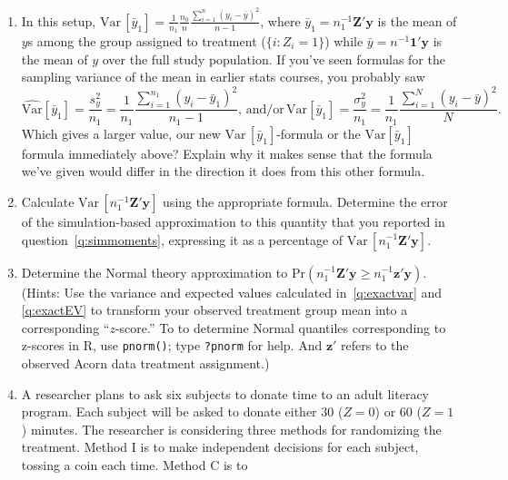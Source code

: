 \documentclass{article}
\begin{document}
\begin{enumerate}
\item In this setup, $\mathrm{Var}\, [\bar{y}_{1}]  = \frac{1}{n_{1}}
  \frac{n_0}{n} \frac{\sum_{i=1}^{n} (y_{i} - \bar y)^{2}}{n-1} $,
  where $\bar{y}_{1} = n_{1}^{-1}\mathbf{Z}'\mathbf{y}$ is the mean of
  $y$s among the group assigned to treatment ($\{i: Z_{i} =1\}$) while
  $\bar{y} = n^{-1}\mathbf{1}'\mathbf{y}$ is the mean of $y$ over
  the full study population.  If you've seen formulas for the sampling
  variance of the mean in earlier stats
  courses, you probably saw
  $$
  \widehat{\mathrm{Var}} \left[\bar{y}_{1}\right] = \frac{s^{2}_{y}}{n_{1}} = \frac{1}{n_{1}}
  \frac{\sum_{i=1}^{n_{1}} (y_{i} - \bar{y}_{1})^{2}}{n_{1}-1}, 
\, \mathrm{and/or}\,
  \mathrm{Var} \left[\bar{y}_{1}\right] = \frac{\sigma_{y}^{2}}{n_{1}} = \frac{1}{n_{1}}
  \frac{\sum_{i=1}^{N} (y_{i} - \bar{y})^{2}}{N}.
  $$
Which gives a larger value, our new $\mathrm{Var}\,
[\bar{y}_{1}]$-formula or the  $\mathrm{Var} \left[\bar{y}_{1}\right]$
formula immediately above?  Explain why it makes
sense that the formula we've given would differ in the direction it does
from this other formula. %
\item Calculate $\mathrm{Var}\, [n_{1}^{-1}\mathbf{Z}'\mathbf{y}]$ using the appropriate
  formula.   Determine the error of the simulation-based
  approximation to this quantity that you reported in question~\ref{q:simmoments},
  expressing it as a percentage of $\mathrm{Var}\,[ n_{1}^{-1}\mathbf{Z}'\mathbf{y}]$. \label{q:exactvar}
\item Determine the Normal theory approximation to
  $\mathrm{Pr}(n_{1}^{-1}\mathbf{Z}'\mathbf{y} \geq
  n_{1}^{-1}\mathbf{z}'\mathbf{y} ) $.  (Hints: Use the variance and
  expected values calculated in~\ref{q:exactvar} and \ref{q:exactEV} to transform your
  observed treatment group mean into a corresponding ``$z$-score.'' 
  To to determine Normal quantiles corresponding to z-scores in R, use
  \texttt{pnorm()}; type \texttt{?pnorm} for help. And $\mathbf{z}'$ refers to
  the observed Acorn data treatment assignment.)
\item %
A researcher plans to ask six subjects to donate time to an adult
literacy program. Each subject will be asked to donate either 30
($Z=0$) or 60 ($Z=1$)
minutes. The researcher is considering three methods for randomizing
the treatment. Method I is to make independent decisions for each
subject, tossing a coin each time. Method C is to

\end{enumerate}
\end{document}

